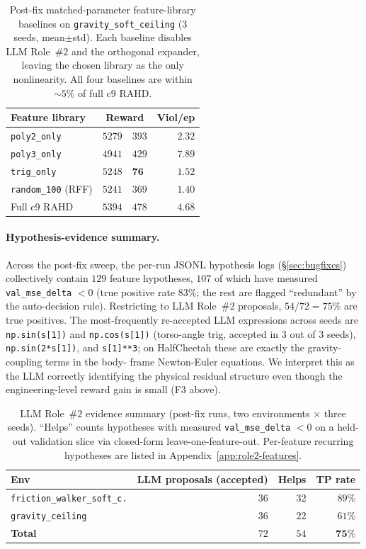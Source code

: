 \documentclass{article}
\theoremstyle{definition}
\begin{document}
\begin{table}[h]
\caption{Post-fix matched-parameter feature-library baselines on
\texttt{gravity\_soft\_ceiling} (3 seeds, mean$\pm$std).  Each baseline
disables LLM Role~\#$2$ and the orthogonal expander, leaving the
chosen library as the only nonlinearity.  All four baselines are
within $\sim 5\%$ of full c9 RAHD.}
\label{tab:feature-baselines}
\centering
\small
\begin{tabular}{lr@{$\,\pm\,$}lr}
\toprule
Feature library     & \multicolumn{2}{c}{Reward}   & Viol/ep \\
\midrule
\texttt{poly2\_only}     & $5279$ & $393$ & $2.32$ \\
\texttt{poly3\_only}     & $4941$ & $429$ & $7.89$ \\
\texttt{trig\_only}      & $5248$ & $\mathbf{76}$ & $1.52$ \\
\texttt{random\_100} (RFF) & $5241$ & $369$ & $1.40$ \\
\midrule
Full c9 RAHD            & $5394$ & $478$ & $4.68$ \\
\bottomrule
\end{tabular}
\end{table}

\paragraph{Hypothesis-evidence summary.}
Across the post-fix sweep, the per-run JSONL hypothesis logs
(\S\ref{sec:bugfixes}) collectively contain $129$ feature
hypotheses, $107$ of which have measured \texttt{val\_mse\_delta} $<0$
(true positive rate $83\%$; the rest are flagged ``redundant'' by the
auto-decision rule).  Restricting to LLM Role~\#$2$ proposals,
$54/72=75\%$ are true positives.  The most-frequently re-accepted LLM
expressions across seeds are \texttt{np.sin(s[1])} and
\texttt{np.cos(s[1])} (torso-angle trig, accepted in $3$ out of $3$
seeds), \texttt{np.sin(2*s[1])}, and \texttt{s[1]**3}; on
HalfCheetah these are exactly the gravity-coupling terms in the body-
frame Newton-Euler equations.  We interpret this as the LLM
correctly identifying the physical residual structure even though the
engineering-level reward gain is small (F3 above).

\begin{table}[h]
\caption{LLM Role~\#$2$ evidence summary (post-fix runs, two
environments × three seeds).  ``Helps'' counts hypotheses with
measured \texttt{val\_mse\_delta} $< 0$ on a held-out validation slice
via closed-form leave-one-feature-out.  Per-feature recurring
hypotheses are listed in Appendix~\ref{app:role2-features}.}
\label{tab:role2-evidence}
\centering
\small
\begin{tabular}{lrrr}
\toprule
Env & LLM proposals (accepted) & Helps & TP rate \\
\midrule
\texttt{friction\_walker\_soft\_c.} & $36$ & $32$ & $89\%$ \\
\texttt{gravity\_ceiling}            & $36$ & $22$ & $61\%$ \\
\midrule
\textbf{Total}                      & $72$ & $54$ & $\mathbf{75\%}$ \\
\bottomrule
\end{tabular}
\end{table}
\end{document}
